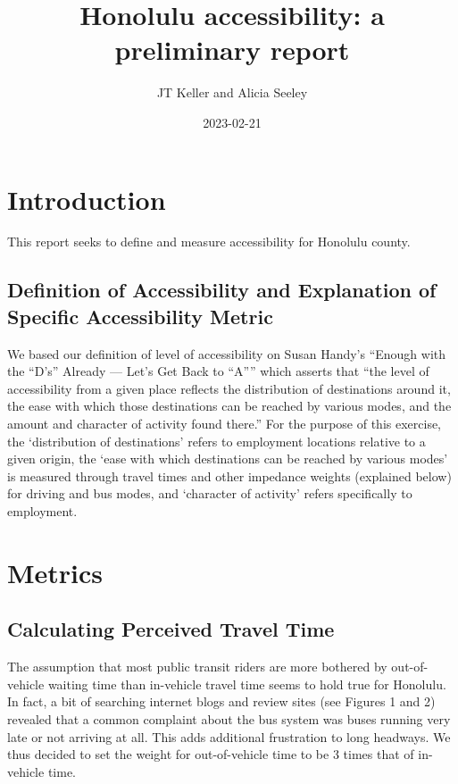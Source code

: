 \documentclass[
]{article}
\title{Honolulu accessibility: a preliminary report}
\author{JT Keller and Alicia Seeley}
\date{2023-02-21}
\begin{document}
\maketitle

\hypertarget{introduction}{%
\section{Introduction}\label{introduction}}

This report seeks to define and measure accessibility for Honolulu
county.

\hypertarget{definition-of-accessibility-and-explanation-of-specific-accessibility-metric}{%
\subsection{Definition of Accessibility and Explanation of Specific
Accessibility
Metric}\label{definition-of-accessibility-and-explanation-of-specific-accessibility-metric}}

We based our definition of level of accessibility on Susan Handy's
``Enough with the ``D's'' Already --- Let's Get Back to ``A'''' which
asserts that ``the level of accessibility from a given place reflects
the distribution of destinations around it, the ease with which those
destinations can be reached by various modes, and the amount and
character of activity found there.'' For the purpose of this exercise,
the `distribution of destinations' refers to employment locations
relative to a given origin, the `ease with which destinations can be
reached by various modes' is measured through travel times and other
impedance weights (explained below) for driving and bus modes, and
`character of activity' refers specifically to employment.

\hypertarget{metrics}{%
\section{Metrics}\label{metrics}}

\hypertarget{calculating-perceived-travel-time}{%
\subsection{Calculating Perceived Travel
Time}\label{calculating-perceived-travel-time}}

The assumption that most public transit riders are more bothered by
out-of-vehicle waiting time than in-vehicle travel time seems to hold
true for Honolulu. In fact, a bit of searching internet blogs and review
sites (see Figures 1 and 2) revealed that a common complaint about the
bus system was buses running very late or not arriving at all. This adds
additional frustration to long headways. We thus decided to set the
weight for out-of-vehicle time to be 3 times that of in-vehicle time.
\end{document}
